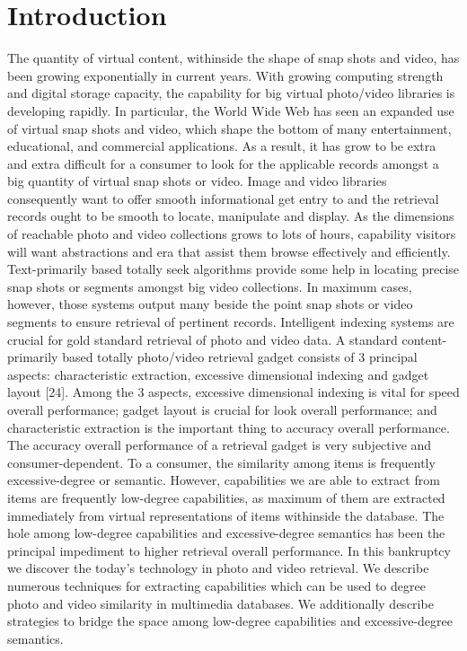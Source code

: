 \chapter{Introduction}
The quantity of virtual content, withinside the shape of snap shots
and video, has been growing exponentially in current years.
With growing computing strength and digital storage
capacity, the capability for big virtual photo/video libraries is
developing rapidly. In particular, the World Wide Web has seen
an expanded use of virtual snap shots and video, which shape
the bottom of many entertainment, educational, and commercial
applications. As a result, it has grow to be extra and extra
difficult for a consumer to look for the applicable records
amongst a big quantity of virtual snap shots or video. Image
and video libraries consequently want to offer smooth informational get entry to and the retrieval records ought to be smooth to
locate, manipulate and display.
As the dimensions of reachable photo and video collections
grows to lots of hours, capability visitors will want
abstractions and era that assist them browse effectively
and efficiently. Text-primarily based totally seek algorithms provide some
help in locating precise snap shots or segments amongst
big video collections. In maximum cases, however, those systems
output many beside the point snap shots or video segments to ensure
retrieval of pertinent records. Intelligent indexing systems
are crucial for gold standard retrieval of photo and video data.
A standard content-primarily based totally photo/video retrieval gadget
consists of 3 principal aspects: characteristic extraction, excessive dimensional indexing and gadget layout [24]. Among the 3
aspects, excessive dimensional indexing is vital for speed
overall performance; gadget layout is crucial for look overall performance; and characteristic extraction is the important thing to accuracy overall performance. The accuracy overall performance of a retrieval gadget is
very subjective and consumer-dependent. To a consumer, the similarity
among items is frequently excessive-degree or semantic. However,
capabilities we are able to extract from items are frequently low-degree
capabilities, as maximum of them are extracted immediately from virtual
representations of items withinside the database. The hole among
low-degree capabilities and excessive-degree semantics has been the
principal impediment to higher retrieval overall performance.
In this bankruptcy we discover the today's technology in
photo and video retrieval. We describe numerous techniques for
extracting capabilities which can be used to degree photo and video
similarity in multimedia databases. We additionally describe strategies to bridge the space among low-degree capabilities and
excessive-degree semantics.